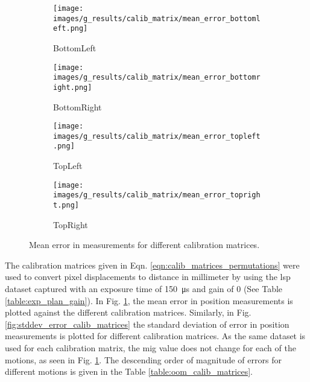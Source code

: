 \begin{figure}[ht]
    \centering
    \begin{subfigure}[b]{0.46\textwidth}
        \centering
        \texttt{[image: images/g\_results/calib\_matrix/mean\_error\_bottomleft.png]}
        \caption{\textsf{BottomLeft}}
    \end{subfigure}
    \hspace{1cm}
    \begin{subfigure}[b]{0.46\textwidth}
        \centering
        \texttt{[image: images/g\_results/calib\_matrix/mean\_error\_bottomright.png]}
        \caption{\textsf{BottomRight}}
    \end{subfigure}

    \vspace{5mm}
    
    \begin{subfigure}[b]{0.46\textwidth}
        \centering
        \texttt{[image: images/g\_results/calib\_matrix/mean\_error\_topleft.png]}
        \caption{\textsf{TopLeft}}
    \end{subfigure}
    \hspace{1cm}
    \begin{subfigure}[b]{0.46\textwidth}
        \centering
        \texttt{[image: images/g\_results/calib\_matrix/mean\_error\_topright.png]}
        \caption{\textsf{TopRight}}
    \end{subfigure}

    \caption{Mean error in measurements for different calibration matrices.}
    \label{fig:mean_error_calib_matrices}
\end{figure}

\noindent The calibration matrices given in Eqn. \ref{eqn:calib_matrices_permutations} were used to convert pixel displacements to distance in millimeter by using the \gls{lsp} dataset captured with an exposure time of \SI{150}{\micro\second} and gain of 0 (See Table \ref{table:exp_plan_gain}). In Fig. \ref{fig:mean_error_calib_matrices}, the mean error in position measurements is plotted against the different calibration matrices. Similarly, in Fig. \ref{fig:stddev_error_calib_matrices} the standard deviation of error in position measurements is plotted for different calibration matrices. As the same dataset is used for each calibration matrix, the \gls{mig} value does not change for each of the motions, as seen in Fig. \ref{fig:mean_error_calib_matrices}. The descending order of magnitude of errors for different motions is given in the Table \ref{table:oom_calib_matrices}.

